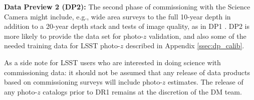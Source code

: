 \documentclass[DM,lsstdraft,toc]{lsstdoc}
\begin{document}
{\bf Data Preview 2 (DP2):} The second phase of commissioning with the Science Camera might include, e.g., wide area surveys to the full 10-year depth in addition to a 20-year depth stack and tests of image quality, as in DP1 .
DP2 is more likely to provide the data set for photo-$z$ validation, and also some of the needed training data for LSST photo-$z$ described in Appendix \ref{ssec:dp_calib}.

As a side note for LSST users who are interested in doing science with commissioning data: it should not be assumed that any release of data products based on commissioning surveys will include photo-$z$ estimates.
The release of any photo-$z$ catalogs prior to DR1 remains at the discretion of the DM team.




\clearpage


\clearpage
\appendix 

\end{document}
